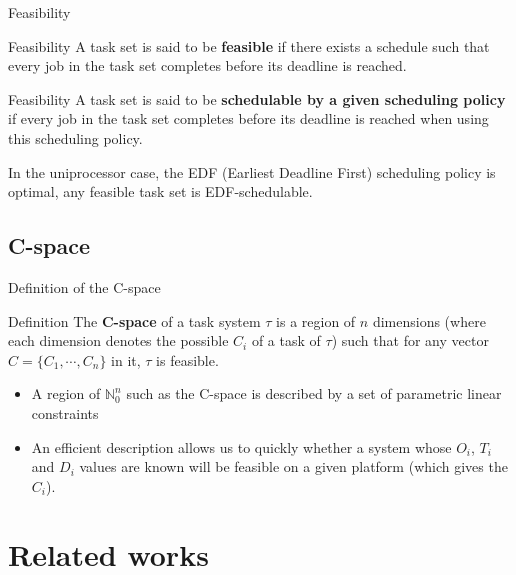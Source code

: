 \documentclass{beamer}
\begin{document}
	\begin{frame}{Feasibility}
		\begin{block}{Feasibility}
        A task set is said to be \textbf{feasible} if there exists a schedule such that every job in the task set completes before its deadline is reached.
        \end{block}

        \begin{block}{Feasibility}
        A task set is said to be \textbf{schedulable by a given scheduling policy} if every job in the task set completes before its deadline is reached when using this scheduling policy.
        \end{block}

        In the uniprocessor case, the EDF (Earliest Deadline First) scheduling policy is optimal, any feasible task set is EDF-schedulable.
	\end{frame}

    \subsection{C-space}

    \begin{frame}{Definition of the C-space}
        \begin{block}{Definition}
            The \textbf{C-space} of a task system $\tau$ is a region of $n$ dimensions (where each dimension denotes the possible $C_i$ of a task of $\tau$) such that for any vector $C = \{ C_1, \cdots, C_{n}\}$ in it, $\tau$ is feasible.
        \end{block}

        \begin{itemize}
            \item A region of $\mathbb{N}_0^n$ such as the C-space is described by a set of parametric linear constraints
            \item An efficient description allows us to quickly  whether a system whose $O_i$, $T_i$ and $D_i$ values are known will be feasible on a given platform (which gives the $C_i$).
        \end{itemize}

    \end{frame}

	\section{Related works}

\begin{frame}
    \tableofcontents[currentsection]
\end{frame}
\end{document}
